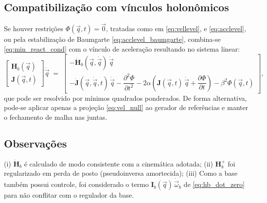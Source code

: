 \subsection{Compatibilização com vínculos holonômicos}
Se houver restrições $\Phi(\vec q,t)=\vec 0$,
tratadas como em \eqref{eq:vellevel},
e \eqref{eq:acclevel},
ou pela estabilização de Baumgarte
\eqref{eq:acclevel_baumgarte},
combina-se \eqref{eq:min_react_cond}
com o vínculo de aceleração resultando no sistema linear:
\begin{equation}
\begin{bmatrix}
\mathbf H_b(\vec q)\\[2pt]
\mathbf J(\vec q,t)
\end{bmatrix}
\ddot{\vec q}
\;=\;
\begin{bmatrix}
-\dot{\mathbf H}_b(\vec q,\dot{\vec q})\,\dot{\vec q}\\[2pt]
-\dot{\mathbf J}(\vec q,\dot{\vec q},t)\,\dot{\vec q}
-\dfrac{\partial^{2}\Phi}{\partial t^{2}}
-2\alpha\!\left(\mathbf J(\vec q,t)\,\dot{\vec q}+\dfrac{\partial \Phi}{\partial t}\right)
-\beta^{2}\Phi(\vec q,t)
\end{bmatrix},
\label{eq:stack_min_react_baumgarte}
\end{equation}
que pode ser resolvido por mínimos quadrados ponderados. De forma alternativa, pode-se aplicar apenas a projeção
\eqref{eq:vel_null}
ao gerador de referências e manter o fechamento de malha nas juntas.

\subsection{Observações}
(i) $\dot{\mathbf H}_b$ é calculado de modo consistente com a cinemática adotada;  
(ii) $\mathbf H_b^{+}$ foi regularizado em perda de posto (pseudoinversa amortecida);  
(iii) Como a base também possui controle, foi considerado o termo
$\mathbf I_b(\vec q)\,\dot{\vec\omega}_b$
de \eqref{eq:hb_dot_zero}
para não conflitar com o regulador da base.